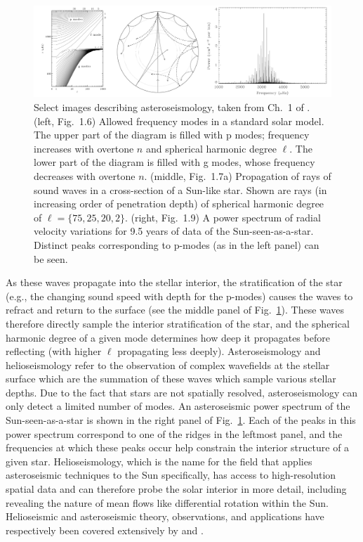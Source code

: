 \begin{figure}[t!]
\includegraphics[width=\textwidth]{./figs/intro/asteroseismology.pdf}
\caption[Introduction to asteroseismology.]
{
	Select images describing asteroseismology, taken from Ch.~1 of \citet{aerts&all2010}.
	(left, Fig.~1.6) Allowed frequency modes in a standard solar model.
	The upper part of the diagram is filled with p modes; frequency increases with overtone $n$ and spherical harmonic degree $\ell$.
	The lower part of the diagram is filled with g modes, whose frequency decreases with overtone $n$.
	(middle, Fig.~1.7a) Propagation of rays of sound waves in a cross-section of a Sun-like star.
	Shown are rays (in increasing order of penetration depth) of spherical harmonic degree of $\ell = \{75, 25, 20, 2\}$.
	(right, Fig.~1.9) A power spectrum of radial velocity variations for 9.5 years of data of the Sun-seen-as-a-star.
	Distinct peaks corresponding to p-modes (as in the left panel) can be seen.
	\label{fig:asteroseismology} 
}
\end{figure}

As these waves propagate into the stellar interior, the stratification of the star (e.g., the changing sound speed with depth for the p-modes) causes the waves to refract and return to the surface (see the middle panel of Fig.~\ref{fig:asteroseismology}).
These waves therefore directly sample the interior stratification of the star, and the spherical harmonic degree of a given mode determines how deep it propagates before reflecting (with higher $\ell$ propagating less deeply).
Asteroseismology and helioseismology refer to the observation of complex wavefields at the stellar surface which are the summation of these waves which sample various stellar depths.
Due to the fact that stars are not spatially resolved, asteroseismology can only detect a limited number of modes.
An asteroseismic power spectrum of the Sun-seen-as-a-star is shown in the right panel of Fig.~\ref{fig:asteroseismology}.
Each of the peaks in this power spectrum correspond to one of the ridges in the leftmost panel, and the frequencies at which these peaks occur help constrain the interior structure of a given star.
Helioseismology, which is the name for the field that applies asteroseismic techniques to the Sun specifically, has access to high-resolution spatial data and can therefore probe the solar interior in more detail, including revealing the nature of mean flows like differential rotation within the Sun.
Helioseismic and asteroseismic theory, observations, and applications have respectively been covered extensively by \cite{christensen-dalsgaard2002} and \cite{aerts&all2010}.


